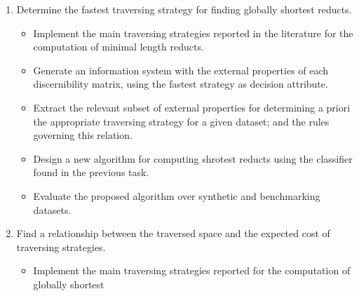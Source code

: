 \documentclass[authoryear,11pt]{elsarticle}
\begin{document}
\begin{enumerate}
  	\item Determine the fastest traversing strategy for finding globally shortest reducts.
	\begin{itemize}
  		\item Implement the main traversing strategies reported in the literature for the computation of 
  			  minimal length reducts.
  		\item Generate an information system with the external properties of each discernibility matrix, using 
  			  the fastest strategy as decision attribute.
  		\item Extract the relevant subset of external properties for determining a priori the appropriate 
  			  traversing strategy for a given dataset; and the rules governing this relation.
  		\item Design a new algorithm for computing shrotest reducts using the classifier found in
  			  the previous task.
  		\item Evaluate the proposed algorithm over synthetic and benchmarking datasets.
  	\end{itemize}
  	\item Find a relationship between the traversed space and the expected cost of traversing strategies.
  	\begin{itemize}
  		\item Implement the main traversing strategies reported for the computation of globally shortest 

\end{itemize}
\end{enumerate}
\end{document}

